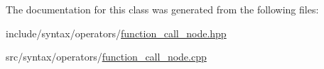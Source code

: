The documentation for this class was generated from the following files\+:\begin{DoxyCompactItemize}
\item 
include/syntax/operators/\hyperlink{function__call__node_8hpp}{function\+\_\+call\+\_\+node.\+hpp}\item 
src/syntax/operators/\hyperlink{function__call__node_8cpp}{function\+\_\+call\+\_\+node.\+cpp}\end{DoxyCompactItemize}
